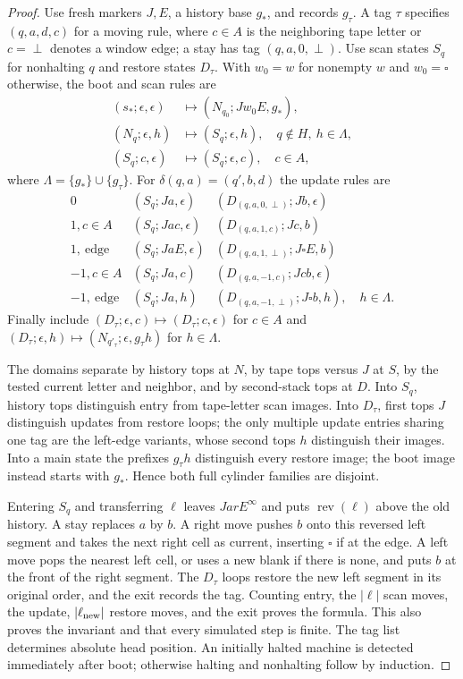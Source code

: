 \begin{proof}
Use fresh markers $J,E$, a history base $g_*$, and records $g_\tau$.  A tag $\tau$ specifies $(q,a,d,c)$ for a moving rule, where $c\in A$ is the neighboring tape letter or $c=\perp$ denotes a window edge; a stay has tag $(q,a,0,\perp)$.  Use scan states $S_q$ for nonhalting $q$ and restore states $D_\tau$.  With $w_0=w$ for nonempty $w$ and $w_0=\square$ otherwise, the boot and scan rules are
\begin{align*}
 (s_*;\epsilon,\epsilon)&\mapsto(N_{q_0};Jw_0E,g_*),\\
 (N_q;\epsilon,h)&\mapsto(S_q;\epsilon,h),\quad q\notin H,\ h\in\Lambda,\\
 (S_q;c,\epsilon)&\mapsto(S_q;\epsilon,c),\quad c\in A,
\end{align*}
where $\Lambda=\{g_*\}\cup\{g_\tau\}$.  For $\delta(q,a)=(q',b,d)$ the update rules are
\[
\begin{array}{c|c|c}
0&(S_q;Ja,\epsilon)&(D_{(q,a,0,\perp)};Jb,\epsilon)\\
1, c\in A&(S_q;Jac,\epsilon)&(D_{(q,a,1,c)};Jc,b)\\
1,\ \text{edge}&(S_q;JaE,\epsilon)&(D_{(q,a,1,\perp)};J\square E,b)\\
-1, c\in A&(S_q;Ja,c)&(D_{(q,a,-1,c)};Jcb,\epsilon)\\
-1,\ \text{edge}&(S_q;Ja,h)&(D_{(q,a,-1,\perp)};J\square b,h),\quad h\in\Lambda.
\end{array}
\]
Finally include $(D_\tau;\epsilon,c)\mapsto(D_\tau;c,\epsilon)$ for $c\in A$ and $(D_\tau;\epsilon,h)\mapsto(N_{q'_\tau};\epsilon,g_\tau h)$ for $h\in\Lambda$.

The domains separate by history tops at $N$, by tape tops versus $J$ at $S$, by the tested current letter and neighbor, and by second-stack tops at $D$.  Into $S_q$, history tops distinguish entry from tape-letter scan images.  Into $D_\tau$, first tops $J$ distinguish updates from restore loops; the only multiple update entries sharing one tag are the left-edge variants, whose second tops $h$ distinguish their images.  Into a main state the prefixes $g_\tau h$ distinguish every restore image; the boot image instead starts with $g_*$.  Hence both full cylinder families are disjoint.

Entering $S_q$ and transferring $\ell$ leaves $Ja rE^\infty$ and puts $\operatorname{rev}(\ell)$ above the old history.  A stay replaces $a$ by $b$.  A right move pushes $b$ onto this reversed left segment and takes the next right cell as current, inserting $\square$ if at the edge.  A left move pops the nearest left cell, or uses a new blank if there is none, and puts $b$ at the front of the right segment.  The $D_\tau$ loops restore the new left segment in its original order, and the exit records the tag.  Counting entry, the $|\ell|$ scan moves, the update, $|\ell_{\rm new}|$ restore moves, and the exit proves the formula.  This also proves the invariant and that every simulated step is finite.  The tag list determines absolute head position.  An initially halted machine is detected immediately after boot; otherwise halting and nonhalting follow by induction.
\end{proof}

